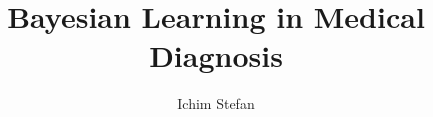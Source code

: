 \documentclass[3p,times,procedia]{elsarticle}
\begin{document}
\begin{frontmatter}



%


\title{\textbf{Bayesian Learning in Medical Diagnosis}}




\author{Ichim Stefan} 

\address{Department of Computer Science, Babe\c s-Bolyai University\\1, M. Kogalniceanu Street, 400084, Cluj-Napoca, Romania\\E-mail: stefan.ichim@stud.ubbcluj.ro}


\end{frontmatter}
\end{document}
